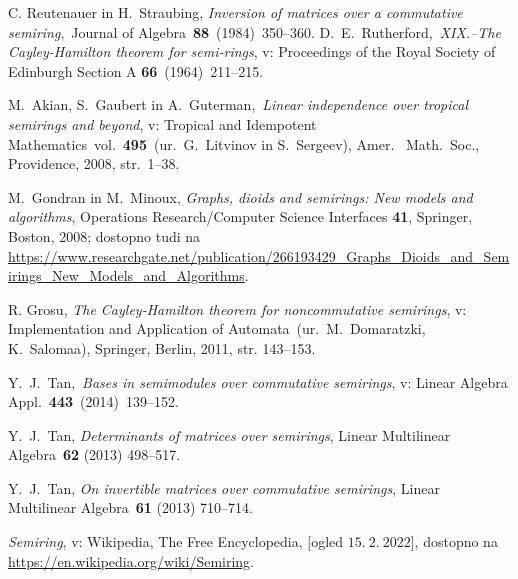 \documentclass[mat1]{fmfdelo}
\begin{document}

\begin{thebibliography}{99}
	 C. Reutenauer in H.~Straubing, \emph{Inversion of matrices over a commutative semiring},~Journal of Algebra~\textbf{88}~(1984)~350--360.	
	 D.~E.~Rutherford,~\emph{XIX.--The Cayley-Hamilton theorem for semi-rings}, v: Proceedings of the Royal Society of Edinburgh Section A \textbf{66}~(1964)~211--215.

	 M.~Akian, S.~Gaubert in A.~Guterman,~\emph{Linear independence over tropical semirings and beyond}, v: Tropical and Idempotent Mathematics~vol.~\textbf{495}~(ur.\ G.~Litvinov in S.~Sergeev), Amer. \ Math.\ Soc., Providence, 2008, str.\ 1--38.
	
	 M.~Gondran in M.~Minoux, \emph{Graphs, dioids and semirings: New models and algorithms}, Operations Research/Computer Science Interfaces \textbf{41}, Springer, Boston, 2008; dostopno tudi na \url{https://www.researchgate.net/publication/266193429_Graphs_Dioids_and_Semirings_New_Models_and_Algorithms}.
	
	 R. Grosu, \emph{The Cayley-Hamilton theorem for noncommutative semirings}, v: Implementation and Application of Automata~(ur.\ M.~Domaratzki, K.~Salomaa), Springer, Berlin, 2011, str. 143--153.

	 Y.\ J.\ Tan,~\emph{Bases in semimodules over commutative semirings}, v: Linear Algebra Appl.~\textbf{443}~(2014)~139--152.
	
	 Y.\ J.\ Tan, \emph{Determinants of matrices over semirings}, Linear Multilinear Algebra~\textbf{62} (2013) 498--517.
	
	 Y.\ J.\ Tan, \emph{On invertible matrices over commutative semirings}, Linear Multilinear Algebra~\textbf{61} (2013) 710--714.
	
	 \emph{Semiring}, v: Wikipedia, The Free Encyclopedia, [ogled $15.~2.~2022$], dostopno na \url{https://en.wikipedia.org/wiki/Semiring}.
	
\end{thebibliography}
\end{document}
